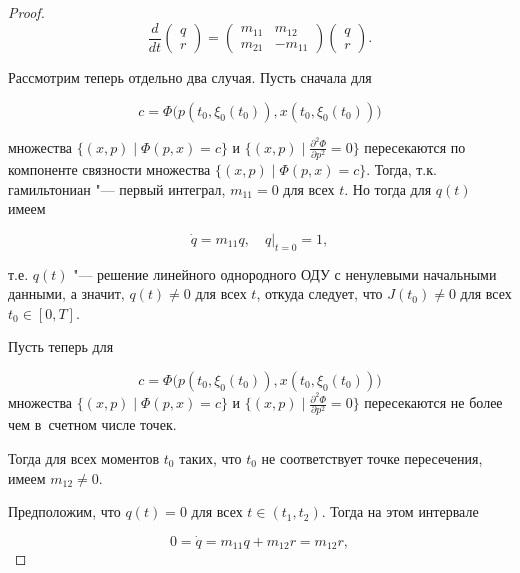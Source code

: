 \begin{proof}
$$

\frac{d}{dt}\left(\begin{array}{l}

q\\ r

\end{array}\right)=\left(\begin{array}{cc} m_{11}&m_{12}\\

m_{21}&-m_{11}

\end{array}\right)\left(\begin{array}{l}

q\\ r

\end{array}\right).

$$



Рассмотрим теперь отдельно два случая. Пусть сначала для 

$$

c=\Phi\bigl(p(t_0,\xi_0(t_0)),x(t_0,\xi_0(t_0))\bigr)

$$

множества $\{(x,p)\mid \Phi(p,x)=c\}$ и $\{(x,p)\mid \frac{\partial^2\Phi}{\partial p^2}=0\}$ пересекаются по компоненте связности множества $\{(x,p)\mid \Phi(p,x)=c\}$. Тогда, т.к. гамильтониан "--- первый интеграл,  $m_{11}=0$ для всех $t$. Но тогда для $q(t)$ имеем 

$$

\dot{q}=m_{11}q,\quad q\bigr|_{t=0}=1,

$$

т.е. $q(t)$ "--- решение линейного однородного ОДУ с ненулевыми начальными данными, а значит, $q(t)\ne0$ для всех $t$, откуда следует, что $J(t_0)\ne0$ для всех $t_0\in[0,T]$. 



Пусть теперь для 

$$c=\Phi\bigl(p(t_0,\xi_0(t_0)),x(t_0,\xi_0(t_0))\bigr)$$ множества $\{(x,p)\mid \Phi(p,x)=c\}$ и $\{(x,p)\mid \frac{\partial^2\Phi}{\partial p^2}=0\}$ пересекаются не более чем в~счетном числе точек. 

Тогда для всех моментов $t_0$ таких, что $t_0$ не соответствует точке пересечения,  имеем $m_{12}\ne0$. 



Предположим, что $q(t)=0$ для всех $t\in(t_1,t_2)$. Тогда на этом интервале 

$$0=\dot{q}=m_{11}q+m_{12}r=m_{12}r,$$ 


\end{proof}
